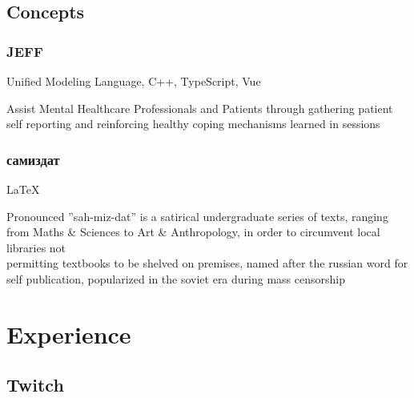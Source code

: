 \documentclass[10pt]{article} %
\begin{document}
\subsection{Concepts}
\subsubsection{JEFF}
\begin{description}[style=multiline, leftmargin=2.75cm]
    \item[Technologies] {Unified Modeling Language, C++, TypeScript, Vue}
    \item[Purpose] {Assist Mental Healthcare Professionals and Patients 
        through gathering patient \\ self reporting and reinforcing healthy 
        coping mechanisms learned in sessions}  
\end{description}
\pagebreak
\subsubsection{самиздат}
\begin{description}[style=multiline, leftmargin=2.75cm]
    \item[Technologies] {LaTeX}
    \item[Purpose] {Pronounced ''sah-miz-dat'' is a satirical undergraduate series of texts, 
        ranging from Maths \& Sciences to Art \& Anthropology, in order to circumvent 
        local libraries not \\ permitting textbooks to be shelved on premises, 
        named after the russian word for self publication, 
        popularized in the soviet era during mass censorship}  
\end{description}

\section{Experience}
\subsection{Twitch}
\end{document}
